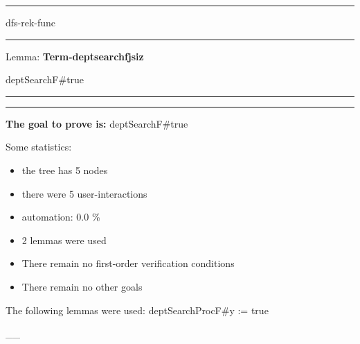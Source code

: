 \documentclass[a4paper]{article}
\begin{document}
\raggedright
              



\begin{center}
\LARGE

\rule{1\textwidth}{3mm}

\vspace{2cm}


\sc dfs-rek-func \\

\vspace{2cm}


\rule{1\textwidth}{3mm}

\vspace{3cm}
\rm

\begin{flushleft}
 Lemma:  \hspace{1cm}\bf Term-deptsearchfjsiz \rm\\

\end{flushleft}
\normalsize

\vspace{3cm}

 \Fol \Do deptSearchF\#\Dc true
                                       

\vspace{3cm}
\rule{1\textwidth}{1mm}
\end{center}

\newpage

\rule{1\textwidth}{1ex}
{\bf The goal to prove is:}
 \Fol \Do deptSearchF\#\Dc true


Some statistics:

\begin{itemize}
\item the tree has 5 nodes
\item there were 5 user-interactions
\item automation: 0.0 \%
\item 2 lemmas were used
\item There remain no first-order verification conditions
\item There remain no other goals
\end{itemize}


The following lemmas were used:
 \Fol \Do deptSearchProcF\#\Dc \Do y := \Dc true

\vspace{-1.5ex}\_\hrulefill \_

 \Fol 
\end{document}
